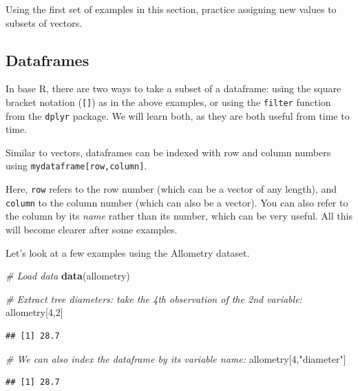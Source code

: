 \documentclass[]{book}
\newenvironment{Shaded}{\begin{snugshade}}{\end{snugshade}}
\newcommand{\CommentTok}[1]{\textcolor[rgb]{0.56,0.35,0.01}{\textit{#1}}}
\newcommand{\DecValTok}[1]{\textcolor[rgb]{0.00,0.00,0.81}{#1}}
\newcommand{\KeywordTok}[1]{\textcolor[rgb]{0.13,0.29,0.53}{\textbf{#1}}}
\newcommand{\NormalTok}[1]{#1}
\newcommand{\StringTok}[1]{\textcolor[rgb]{0.31,0.60,0.02}{#1}}
\let\BeginKnitrBlock\begin \let\EndKnitrBlock\end
\begin{document}
\BeginKnitrBlock{rmdtry}
Using the first set of examples in this section, practice assigning new values to subsets of vectors.
\EndKnitrBlock{rmdtry}

\hypertarget{subsetdataframes}{%
\subsection{Dataframes}\label{subsetdataframes}}

In base R, there are two ways to take a subset of a dataframe: using the square bracket notation (\texttt{{[}{]}}) as in the above examples, or using the \texttt{filter} function from the \texttt{dplyr} package. We will learn both, as they are both useful from time to time.

Similar to vectors, dataframes can be indexed with row and column numbers using \texttt{mydataframe{[}row,column{]}}.

Here, \texttt{row} refers to the row number (which can be a vector of any length), and \texttt{column} to the column number (which can also be a vector). You can also refer to the column by its \emph{name} rather than its number, which can be very useful. All this will become clearer after some examples.

Let's look at a few examples using the Allometry dataset.

\begin{Shaded}
\begin{Highlighting}[]
\CommentTok{# Load data}
\KeywordTok{data}\NormalTok{(allometry)}

\CommentTok{# Extract tree diameters: take the 4th observation of the 2nd variable:}
\NormalTok{allometry[}\DecValTok{4}\NormalTok{,}\DecValTok{2}\NormalTok{]}
\end{Highlighting}
\end{Shaded}

\begin{verbatim}
## [1] 28.7
\end{verbatim}

\begin{Shaded}
\begin{Highlighting}[]
\CommentTok{# We can also index the dataframe by its variable name:}
\NormalTok{allometry[}\DecValTok{4}\NormalTok{,}\StringTok{"diameter"}\NormalTok{]}
\end{Highlighting}
\end{Shaded}

\begin{verbatim}
## [1] 28.7
\end{verbatim}
\end{document}
